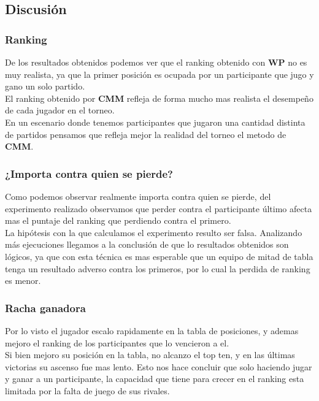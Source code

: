 \subsection{Discusión}


\subsubsection{Ranking}

De los resultados obtenidos podemos ver que el ranking obtenido con \textbf{WP} no es muy realista, ya que la primer posición es ocupada por un participante que jugo y gano un solo partido. \\

El ranking obtenido por \textbf{CMM} refleja de forma mucho mas realista el desempeño de cada jugador en el torneo. \\

En un escenario donde tenemos participantes que jugaron una cantidad distinta de partidos pensamos que refleja mejor la realidad del torneo el metodo de \textbf{CMM}. \\


\subsubsection{¿Importa contra quien se pierde?}

Como podemos observar realmente importa contra quien se pierde, del experimento realizado observamos que perder contra el participante último afecta mas el puntaje del ranking que perdiendo contra el primero. \\

La hipótesis con la que calculamos el experimento resulto ser falsa. Analizando más ejecuciones llegamos a la conclusión de que lo resultados obtenidos son lógicos, ya que con esta técnica es mas esperable que un equipo de mitad de tabla tenga un resultado adverso contra los primeros, por lo cual la perdida de ranking es menor. \\


\subsubsection{Racha ganadora}

Por lo visto el jugador escalo rapidamente en la tabla de posiciones, y ademas mejoro el ranking de los participantes que lo vencieron a el.\\

Si bien mejoro su posición en la tabla, no alcanzo el top ten, y en las últimas victorias su ascenso fue mas lento. Esto nos hace concluir que solo haciendo jugar y ganar a un participante, la capacidad que tiene para crecer en el ranking esta limitada por la falta de juego de sus rivales.



